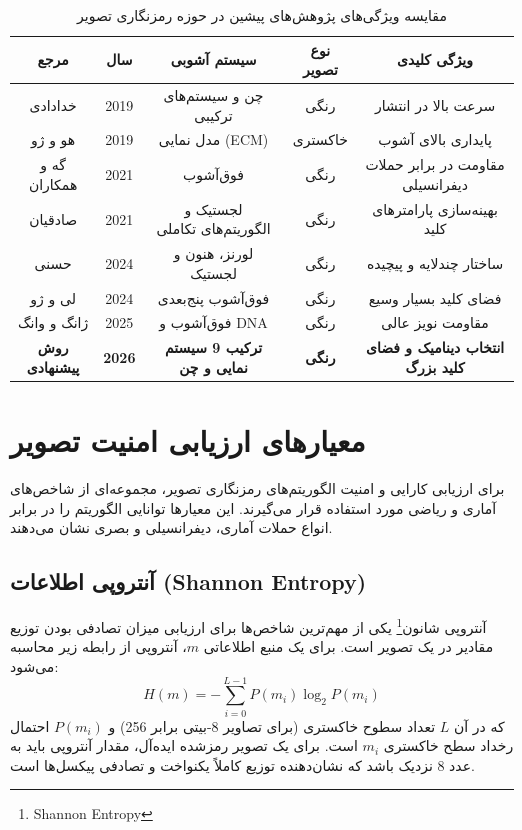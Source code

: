 \documentclass[a4paper,12pt]{report}
\renewcommand{\%}{\lr{\oldpercent}}
\providecommand{\lr}[1]{#1}
\providecommand{\LTRfootnote}[1]{\footnote{#1}}
\begin{document}
\begin{table}[h]
\centering
\caption{مقایسه ویژگی‌های پژوهش‌های پیشین در حوزه رمزنگاری تصویر} \label{tab:lit_review_comp}
\small
\begin{tabular}{|c|c|c|c|c|}
\hline
\textbf{مرجع} & \textbf{سال} & \textbf{سیستم آشوبی} & \textbf{نوع تصویر} & \textbf{ویژگی کلیدی} \\ \hline
خدادادی\cite{ref7} & 2019 & چن و سیستم‌های ترکیبی & رنگی & سرعت بالا در انتشار \\ \hline
هو و ژو\cite{ref4} & 2019 & مدل نمایی (\lr{ECM}) & خاکستری & پایداری بالای آشوب \\ \hline
گه و همکاران\cite{ref12} & 2021 & فوق‌آشوب & رنگی & مقاومت در برابر حملات دیفرانسیلی \\ \hline
صادقیان\cite{ref11} & 2021 & لجستیک و الگوریتم‌های تکاملی & رنگی & بهینه‌سازی پارامترهای کلید \\ \hline
حسنی\cite{ref13} & 2024 & لورنز، هنون و لجستیک & رنگی & ساختار چندلایه و پیچیده \\ \hline
لی و ژو\cite{ref52} & 2024 & فوق‌آشوب پنج‌بعدی & رنگی & فضای کلید بسیار وسیع \\ \hline
ژانگ و وانگ\cite{ref51} & 2025 & فوق‌آشوب و \lr{DNA} & رنگی & مقاومت نویز عالی \\ \hline
\textbf{روش پیشنهادی} & \textbf{2026} & \textbf{ترکیب 9 سیستم نمایی و چن} & \textbf{رنگی} & \textbf{انتخاب دینامیک و فضای کلید بزرگ} \\ \hline
\end{tabular}
\end{table}

\section{معیارهای ارزیابی امنیت تصویر} \label{sec:security_metrics_theory}
برای ارزیابی کارایی و امنیت الگوریتم‌های رمزنگاری تصویر، مجموعه‌ای از شاخص‌های آماری و ریاضی مورد استفاده قرار می‌گیرند. این معیارها توانایی الگوریتم را در برابر انواع حملات آماری، دیفرانسیلی و بصری نشان می‌دهند.

\subsection{آنتروپی اطلاعات (\lr{Shannon Entropy})}
آنتروپی شانون\LTRfootnote{Shannon Entropy} یکی از مهم‌ترین شاخص‌ها برای ارزیابی میزان تصادفی بودن توزیع مقادیر در یک تصویر است. برای یک منبع اطلاعاتی $m$، آنتروپی از رابطه زیر محاسبه می‌شود:
\begin{equation} \label{eq:entropy_def}
H(m) = -\sum_{i=0}^{L-1} P(m_i) \log_2 P(m_i)
\end{equation}
که در آن $L$ تعداد سطوح خاکستری (برای تصاویر 8-بیتی برابر 256) و $P(m_i)$ احتمال رخداد سطح خاکستری $m_i$ است. برای یک تصویر رمزشده ایده‌آل، مقدار آنتروپی باید به عدد 8 نزدیک باشد که نشان‌دهنده توزیع کاملاً یکنواخت و تصادفی پیکسل‌ها است\cite{ref50}.
\end{document}
